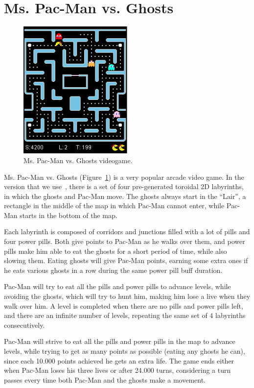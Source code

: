 \documentclass{llncs}
\newcommand{\pacman}{Ms. Pac-Man vs. Ghosts }
\newcommand{\paco}{Pac-Man }
\begin{document}
\section{\pacman}
\label{sec:pacmanai}
%

\begin{figure}[tb]
	\centering
	\includegraphics[width=0.50\textwidth]{images/PacMan_ss.png}
	\caption{\pacman videogame.}
	\label{fig:pac-man}
\end{figure}

\pacman (Figure~\ref{fig:pac-man}) is a very popular arcade video game. In the version that we use~\cite{mspacmangithub}, there is a set of four pre-generated toroidal 2D labyrinths, in which the ghosts and \paco move. The ghosts always start in the ``Lair'', a rectangle in the middle of the map in which \paco cannot enter, while \paco starts in the bottom of the map. 

Each labyrinth is composed of corridors and junctions filled with a lot of pills and four power pills. Both give points to \paco as he walks over them, and power pills make him able to eat the ghosts for a short period of time, while also slowing them. Eating ghosts will give \paco points, earning some extra ones if he eats various ghosts in a row during the same power pill buff duration.

\paco will try to eat all the pills and power pills to advance levels, while avoiding the ghosts, which will try to hunt him, making him lose a live when they walk over him. A level is completed when there are no pills and power pills left, and there are an infinite number of levels, repeating the same set of 4 labyrinths consecutively.

\paco will strive to eat all the pills and power pills in the map to advance levels, while trying to get as many points as possible (eating any ghosts he can), since each 10.000 points achieved he gets an extra life. The game ends either when \paco loses his three lives or after 24.000 turns, considering a turn passes every time both \paco and the ghosts make a movement.
\end{document}
